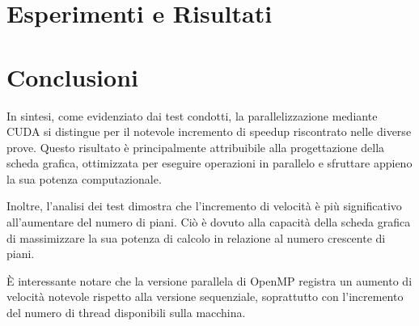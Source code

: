 \documentclass[11pt]{article}
\begin{document}
    \section{Esperimenti e Risultati}\label{sec:tests}
    

    \section{Conclusioni}\label{sec:conclusioni}
    In sintesi, come evidenziato dai test condotti, la parallelizzazione mediante CUDA si distingue per il notevole
    incremento di speedup riscontrato nelle diverse prove.
    Questo risultato è principalmente attribuibile alla progettazione della scheda grafica, ottimizzata per eseguire
    operazioni in parallelo e sfruttare appieno la sua potenza computazionale.

    Inoltre, l'analisi dei test dimostra che l'incremento di velocità è più significativo all'aumentare del numero di piani.
    Ciò è dovuto alla capacità della scheda grafica di massimizzare la sua potenza di calcolo in relazione al numero crescente di piani.

    È interessante notare che la versione parallela di OpenMP registra un aumento di velocità notevole rispetto alla versione sequenziale,
    soprattutto con l'incremento del numero di thread disponibili sulla macchina.
\end{document}

